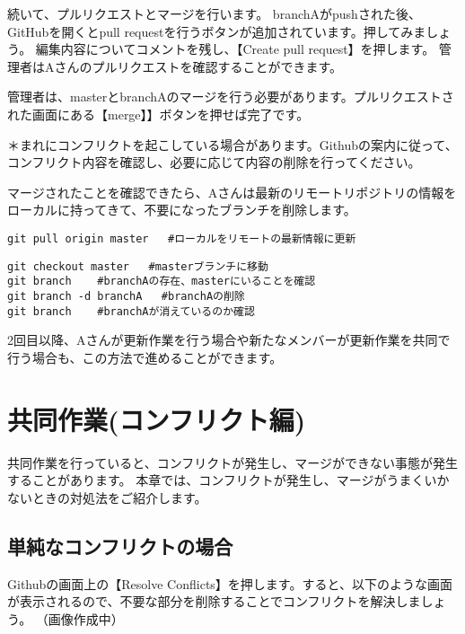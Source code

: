 \documentclass[
]{book}
\begin{document}
続いて、プルリクエストとマージを行います。
branchAがpushされた後、GitHubを開くとpull requestを行うボタンが追加されています。押してみましょう。
編集内容についてコメントを残し、【Create pull request】を押します。
管理者はAさんのプルリクエストを確認することができます。

管理者は、masterとbranchAのマージを行う必要があります。プルリクエストされた画面にある【merge】】ボタンを押せば完了です。

＊まれにコンフリクトを起こしている場合があります。Githubの案内に従って、コンフリクト内容を確認し、必要に応じて内容の削除を行ってください。

マージされたことを確認できたら、Aさんは最新のリモートリポジトリの情報をローカルに持ってきて、不要になったブランチを削除します。

\begin{verbatim}
git pull origin master   #ローカルをリモートの最新情報に更新
\end{verbatim}

\begin{verbatim}
git checkout master   #masterブランチに移動
git branch    #branchAの存在、masterにいることを確認
git branch -d branchA   #branchAの削除
git branch    #branchAが消えているのか確認
\end{verbatim}

2回目以降、Aさんが更新作業を行う場合や新たなメンバーが更新作業を共同で行う場合も、この方法で進めることができます。

\hypertarget{ux5171ux540cux4f5cux696dux30b3ux30f3ux30d5ux30eaux30afux30c8ux7de8}{%
\chapter{共同作業(コンフリクト編)}\label{ux5171ux540cux4f5cux696dux30b3ux30f3ux30d5ux30eaux30afux30c8ux7de8}}

共同作業を行っていると、コンフリクトが発生し、マージができない事態が発生することがあります。
本章では、コンフリクトが発生し、マージがうまくいかないときの対処法をご紹介します。

\hypertarget{ux5358ux7d14ux306aux30b3ux30f3ux30d5ux30eaux30afux30c8ux306eux5834ux5408}{%
\section{単純なコンフリクトの場合}\label{ux5358ux7d14ux306aux30b3ux30f3ux30d5ux30eaux30afux30c8ux306eux5834ux5408}}

Githubの画面上の【Resolve Conflicts】を押します。すると、以下のような画面が表示されるので、不要な部分を削除することでコンフリクトを解決しましょう。
（画像作成中）
\end{document}
